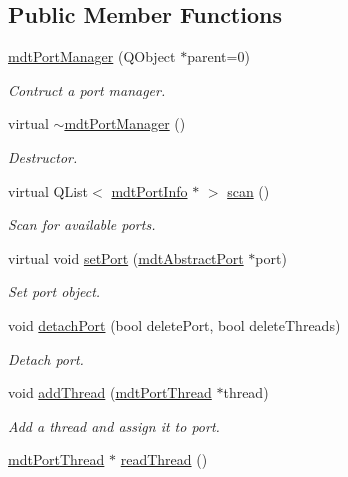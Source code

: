 \subsection*{Public Member Functions}
\begin{DoxyCompactItemize}
\item 
\hyperlink{classmdt_port_manager_a5ec36523089b7528d973e29cdbc64d01}{mdtPortManager} (QObject $\ast$parent=0)
\begin{DoxyCompactList}\small\item\em Contruct a port manager. \end{DoxyCompactList}\item 
virtual \hyperlink{classmdt_port_manager_adf797f8fd7a3ffdc000890a224e4c1b6}{$\sim$mdtPortManager} ()
\begin{DoxyCompactList}\small\item\em Destructor. \end{DoxyCompactList}\item 
virtual QList$<$ \hyperlink{classmdt_port_info}{mdtPortInfo} $\ast$ $>$ \hyperlink{classmdt_port_manager_ad56afb411ab5468005fca04767557ece}{scan} ()
\begin{DoxyCompactList}\small\item\em Scan for available ports. \end{DoxyCompactList}\item 
virtual void \hyperlink{classmdt_port_manager_afcd156b2d0c9d340999935efb6cd8cb6}{setPort} (\hyperlink{classmdt_abstract_port}{mdtAbstractPort} $\ast$port)
\begin{DoxyCompactList}\small\item\em Set port object. \end{DoxyCompactList}\item 
void \hyperlink{classmdt_port_manager_a39cb4af4aedc0b6b7c4d4f53002c3fd1}{detachPort} (bool deletePort, bool deleteThreads)
\begin{DoxyCompactList}\small\item\em Detach port. \end{DoxyCompactList}\item 
void \hyperlink{classmdt_port_manager_ab62591409d019a4a2576b4310c411b8f}{addThread} (\hyperlink{classmdt_port_thread}{mdtPortThread} $\ast$thread)
\begin{DoxyCompactList}\small\item\em Add a thread and assign it to port. \end{DoxyCompactList}\item 
\hyperlink{classmdt_port_thread}{mdtPortThread} $\ast$ \hyperlink{classmdt_port_manager_ad9233b5156a45f2684783317d75fdf9b}{readThread} ()

\end{DoxyCompactItemize}
